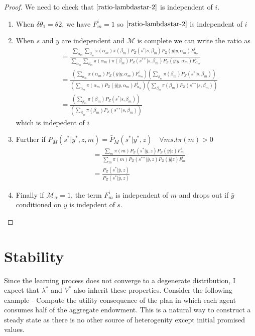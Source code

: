\documentclass[12pt]{article}
\newtheorem*{proof}{Proof}
\begin{document}
\begin{proof}
We need to check that $\ref{ratio-lambdastar-2}$ is independent of $i$. 
\begin{enumerate}
	\item When  $\delta\theta_1=\theta2$, we have $F^i_m=1$ so $\ref{ratio-lambdastar-2}$ is independent of $i$
	\item When $s$ and $y$ are independent and $\mathcal{M}$ is complete we can write the ratio as
	\begin{align}
&=\frac{
\sum_{\alpha_m}\sum_{\beta_m}\pi(\alpha_m)\pi(\beta_m)P_Z(s^*|s,\beta_m)P_Z(\bar{y}|y,\alpha_m)F^i_{\alpha_m
}
}
{\sum_{\alpha_m}\sum_{\beta_m}\pi(\alpha_m)\pi(\beta_m)P_Z(s^{**}|s,\beta_m)P_Z(\bar{y}|y,\alpha_m)F^i_{\alpha_m
}
}\\
&=\frac{
\left(\sum_{\alpha_m}\pi(\alpha_m)P_Z(\bar{y}|y,\alpha_m)F^i_{\alpha_m
}\right)\left(\sum_{\beta_m} \pi(\beta_m)P_Z(s^*|s,\beta_m)\right)
}
{
\left(\sum_{\alpha_m}\pi(\alpha_m)P_Z(\bar{y}|y,\alpha_m)F^i_{\alpha_m
}\right)\left(\sum_{\beta_m} \pi(\beta_m)P_Z(s^{**}|s,\beta_m)\right)
}\\
&=\frac{
\left(\sum_{\beta_m} \pi(\beta_m)P_Z(s^*|s,\beta_m)\right)
}
{
\left(\sum_{\beta_m} \pi(\beta_m)P_Z(s^{**}|s,\beta_m)\right)
}
\end{align}
which is indepedent of $i$
\item Further if  $P_M(s^*|y^*,z,m)=\bar{P}_M(s^*|y^*,z) \quad \forall m s.t \pi(m) >0$   
\begin{align}
&=\frac{\sum_{m}\pi(m)P_Z(s^*|\bar{y},z)P_Z(\bar{y}|z)F^i_m
}
{\sum_{m}\pi(m)P_Z(s^{**}|\bar{y},z)P_Z(\bar{y}|z)F^i_m
}\\
&=\frac{P_Z(s^*|\bar{y},z)}
{
P_Z(s^*|\bar{y},z)
}
\end{align}

\item Finally if $\mathcal{M}_{\alpha}=1$, the term $F^i_m$ is independent of $m$ and drops out if $\bar{y}$ conditioned on $y$ is indepdent of $s$.

\end{enumerate}


\end{proof}

\section{Stability}

Since the learning process does not converge to a degenerate distribution, I expect that $\lambda^{*}$ and $V^{*}$ also inherit these properties. Consider the following example - Compute the utility consequence of the plan in which each agent consumes half of the aggregate endowment.  This is a natural way to construct a steady state as there is no other source of heterogenity except initial promised values. 
\end{document}
